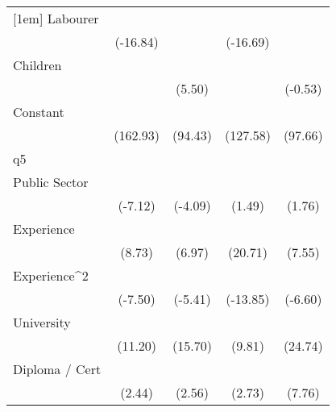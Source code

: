 {\begin{tabular}{l*{4}{c}}
[1em]
Labourer            &            \sym{***}&                     &            \sym{***}&                     \\
                    &    (-16.84)         &                     &    (-16.69)         &                     \\
[1em]
Children            &                     &            \sym{***}&                     &                     \\
                    &                     &      (5.50)         &                     &     (-0.53)         \\
[1em]
Constant            &            \sym{***}&            \sym{***}&            \sym{***}&            \sym{***}\\
                    &    (162.93)         &     (94.43)         &    (127.58)         &     (97.66)         \\
\hline
q5                  &                     &                     &                     &                     \\
Public Sector       &            \sym{***}&            \sym{***}&                     &                     \\
                    &     (-7.12)         &     (-4.09)         &      (1.49)         &      (1.76)         \\
[1em]
Experience          &            \sym{***}&            \sym{***}&            \sym{***}&            \sym{***}\\
                    &      (8.73)         &      (6.97)         &     (20.71)         &      (7.55)         \\
[1em]
Experience^{2}      &            \sym{***}&            \sym{***}&            \sym{***}&            \sym{***}\\
                    &     (-7.50)         &     (-5.41)         &    (-13.85)         &     (-6.60)         \\
[1em]
University          &            \sym{***}&            \sym{***}&            \sym{***}&            \sym{***}\\
                    &     (11.20)         &     (15.70)         &      (9.81)         &     (24.74)         \\
[1em]
Diploma / Cert      &            \sym{*}  &            \sym{*}  &            \sym{**} &            \sym{***}\\
                    &      (2.44)         &      (2.56)         &      (2.73)         &      (7.76)         \\

\end{tabular}}
